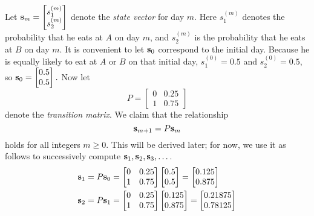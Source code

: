 \documentclass{ximera}
\begin{document}
\begin{example}
\begin{explanation}
Let ${\bf s}_{m} = \begin{bmatrix}
s_{1}^{(m)} \\
s_{2}^{(m)}
\end{bmatrix}$
 denote the \textit{state vector} for day $m$. Here $s_{1}^{(m)}$ denotes the probability that he eats at $A$ on day $m$, and $s_{2}^{(m)}$ is the probability that he eats at $B$ on day $m$. It is convenient to let ${\bf s}_{0}$ correspond to the initial day. Because he is equally likely to eat at $A$ or $B$ on that initial day, $s_{1}^{(0)} = 0.5$ and $s_{2}^{(0)} = 0.5$, so ${\bf s}_{0} = \begin{bmatrix}
0.5 \\
0.5
\end{bmatrix}.$
 Now let
\begin{equation*}
P = \begin{bmatrix}
0 & 0.25 \\
1 & 0.75
\end{bmatrix}
\end{equation*}
denote the \textit{transition matrix}. We claim that the relationship
\begin{equation*}
{\bf s}_{m+1} = P{\bf s}_m
\end{equation*}
holds for all integers $m \geq 0$. This will be derived later; for now, we use it as follows to successively compute ${\bf s}_{1}, {\bf s}_{2}, {\bf s}_{3}, \dots$.
\begin{align*}
{\bf s}_{1} &= P{\bf s}_0 = \begin{bmatrix}
0 & 0.25 \\
1 & 0.75
\end{bmatrix}
\begin{bmatrix}
0.5 \\
0.5
\end{bmatrix} =
\begin{bmatrix}
0.125 \\
0.875
\end{bmatrix} \\
{\bf s}_{2} &= P{\bf s}_1 =  \begin{bmatrix}
0 & 0.25 \\
1 & 0.75
\end{bmatrix}
\begin{bmatrix}
0.125 \\
0.875
\end{bmatrix} =
\begin{bmatrix}
0.21875 \\
0.78125
\end{bmatrix} \\

\end{align*}
\end{explanation}
\end{example}
\end{document}

